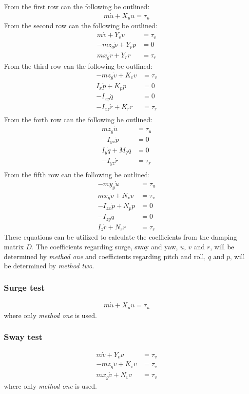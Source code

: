 From the first row can the following be outlined:
\begin{align}
m\dot u + X_uu = \tau_{u}
\end{align}
From the second row can the following be outlined:
\begin{align}
m\dot v + Y_vv &= \tau_{v}\\
-mz_g\dot p + Y_pp &= 0\\
mx_g\dot r + Y_rr &= \tau_{r}
\end{align}
From the third row can the following be outlined:
\begin{align}
-mz_g\dot v + K_vv &= \tau_{v}\\
I_x\dot p + K_pp &= 0\\
-I_{xy}\dot q &= 0\\
-I_{xz}\dot r + K_rr &= \tau_{r}\\
\end{align}
From the forth row can the following be outlined:
\begin{align}
mz_g\dot u &= \tau_{u}\\
-I_{yx}\dot p &= 0\\
I_y\dot q + M_qq &= 0\\
-I_{yz}\dot r &= \tau_{r}\\
\end{align}
From the fifth row can the following be outlined:
\begin{align}
-my_g\dot u &= \tau_{u}\\
mx_g\dot v + N_vv &= \tau_{v}\\
-I_{zx}\dot p + N_pp &= 0\\
-I_{zy}\dot q &= 0\\
I_z\dot r + N_rr &= \tau_{r}
\end{align}
These equations can be utilized to calculate the coefficients from the damping matrix $D$. The coefficients regarding surge, sway and yaw, $u$, $v$ and $r$, will be determined by \textit{method one} and coefficients regarding pitch and roll, $q$ and $p$, will be determined by \textit{method two}.

\subsubsection{Surge test}
\begin{align}
m\dot u + X_uu = \tau_{u}
\end{align}
where only \textit{method one} is used.

\subsubsection{Sway test}
\begin{align}
m\dot v + Y_vv &= \tau_{v}\\
-mz_g\dot v + K_vv &= \tau_{v}\\
mx_g\dot v + N_vv &= \tau_{v}
\end{align}
where only \textit{method one} is used.


